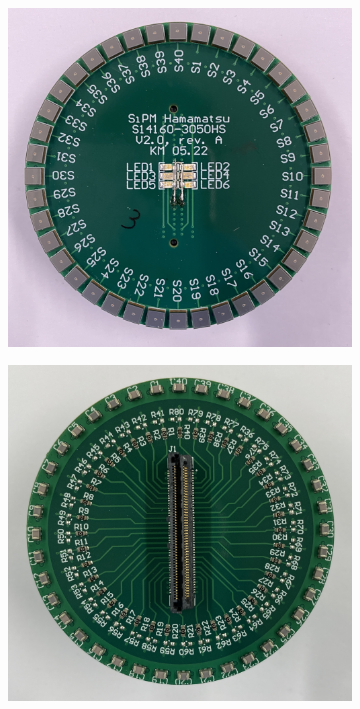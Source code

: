 \begin{figure}
	\centering
	\begin{subfigure}[b]{0.48\textwidth}
		\centering
		\includegraphics[width=1.\textwidth]{pictures/sipm_ham_pcb_front}
		\caption{}
		\label{}
	\end{subfigure}
	\begin{subfigure}[b]{0.48\textwidth}
		\centering
		\includegraphics[width=1.\textwidth]{pictures/sipm_ham_pcb_back}

\end{subfigure}
\end{figure}
